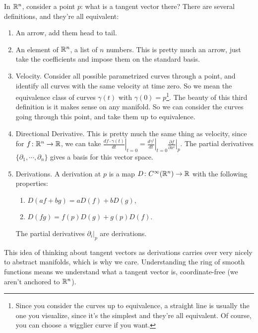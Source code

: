 In $\mathbb{R}^n $, consider a point $p$: what is a tangent vector there? There are several definitions, and they're all equivalent:
\begin{enumerate}
    \item An arrow, add them head to tail.
    \item An element of $\mathbb{R}^n $, a list of $n$ numbers. This is pretty much an arrow, just take the coefficients and impose them on the standard basis.
    \item Velocity. Consider all possible parametrized curves through a point, and identify all curves with the same velocity at time zero. So we mean the equivalence class of curves $\gamma (t)$ with $\gamma (0)=p$\footnote{Since you consider the curves up to equivalence, a straight line is usually the one you visualize, since it's the simplest and they're all equivalent. Of course, you can choose a wigglier curve if you want.}. The beauty of this third definition is it makes sense on any manifold. So we can consider the curves going through this point, and take them up to equivalence.
    \item Directional Derivative. This is pretty much the same thing as velocity, since for $f \colon \mathbb{R}^n  \to \mathbb{R}$, we can take $\left. \frac{d f\cdot \gamma (t)}{dt} \right| _{t=0}=\left. \frac{d\gamma ^i }{dt} \right|_{t=0}\left. \frac{\partial f}{\partial x^i } \right| _p $. The partial derivatives $\{\partial_1,\cdots ,\partial_n  \} $ gives a basis for this vector space.
                \item Derivations. A derivation at $p$ is a map $D \colon C^{\infty}(\mathbb{R}^n ) \to \mathbb{R}$ with the following properties:
                    \begin{enumerate}[label=(\arabic*)]
                        \item $D(af+bg)=aD(f)+b D(g)$,
                        \item $D(fg)=f(p)D(g)+g(p)D(f)$.
                    \end{enumerate}
                    The partial derivatives $\partial _i |_p$ are derivations.
\end{enumerate}
This idea of thinking about tangent vectors as derivations carries over very nicely to abstract manifolds, which is why we care. Understanding the ring of smooth functions means we understand what a tangent vector is, coordinate-free (we aren't anchored to $\mathbb{R}^n $). 

